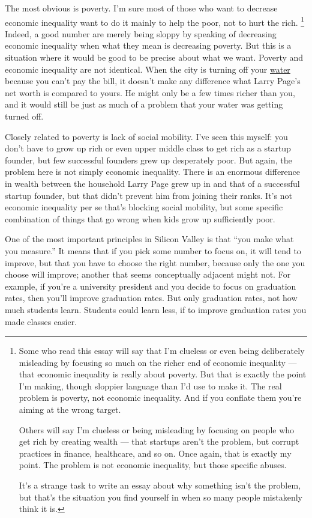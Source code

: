 \documentclass[12pt]{book}
\begin{document}
The most obvious is poverty. I'm sure most of those who want to decrease
economic inequality want to do it mainly to help the poor, not to hurt
the rich. \footnote{Some who read this essay will say that I'm clueless or even
being deliberately misleading by focusing so much on the richer end of
economic inequality --- that economic inequality is really about
poverty. But that is exactly the point I'm making, though sloppier
language than I'd use to make it. The real problem is poverty, not
economic inequality. And if you conflate them you're aiming at the wrong
target.

Others will say I'm clueless or being misleading by focusing on people
who get rich by creating wealth --- that startups aren't the problem,
but corrupt practices in finance, healthcare, and so on. Once again,
that is exactly my point. The problem is not economic inequality, but
those specific abuses.

It's a strange task to write an essay about why something isn't the
problem, but that's the situation you find yourself in when so many
people mistakenly think it is.} Indeed, a good number are merely being
sloppy by speaking of decreasing economic inequality when what they mean
is decreasing poverty. But this is a situation where it would be good to
be precise about what we want. Poverty and economic inequality are not
identical. When the city is turning off your
\href{http://www.theatlantic.com/business/archive/2014/07/what-happens-when-detroit-shuts-off-the-water-of-100000-people/374548/}{water}
because you can't pay the bill, it doesn't make any difference what
Larry Page's net worth is compared to yours. He might only be a few
times richer than you, and it would still be just as much of a problem
that your water was getting turned off.

Closely related to poverty is lack of social mobility. I've seen this
myself: you don't have to grow up rich or even upper middle class to get
rich as a startup founder, but few successful founders grew up
desperately poor. But again, the problem here is not simply economic
inequality. There is an enormous difference in wealth between the
household Larry Page grew up in and that of a successful startup
founder, but that didn't prevent him from joining their ranks. It's not
economic inequality per se that's blocking social mobility, but some
specific combination of things that go wrong when kids grow up
sufficiently poor.

One of the most important principles in Silicon Valley is that ``you
make what you measure.'' It means that if you pick some number to focus
on, it will tend to improve, but that you have to choose the right
number, because only the one you choose will improve; another that seems
conceptually adjacent might not. For example, if you're a university
president and you decide to focus on graduation rates, then you'll
improve graduation rates. But only graduation rates, not how much
students learn. Students could learn less, if to improve graduation
rates you made classes easier.
\end{document}
